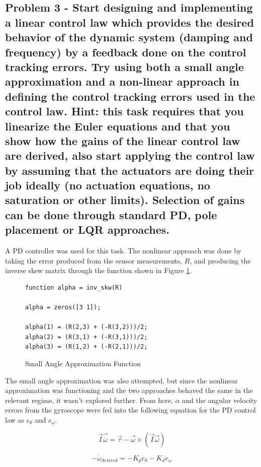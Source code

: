 \subsection{Problem 3 - Start designing and implementing a linear control law which provides the desired behavior of the dynamic system (damping and frequency) by a feedback done on the control tracking errors. Try using both a small angle approximation and a non-linear approach in defining the control tracking errors used in the control law. Hint: this task requires that you linearize the Euler equations and that you show how the gains of the linear control law are derived, also start applying the control law by assuming that the actuators are doing their job ideally (no actuation equations, no saturation or other limits). Selection of gains can be done through standard PD, pole placement or LQR approaches.}

A PD controller was used for this task. The nonlinear approach was done by taking the error produced from the sensor measurements, $R$, and producing the inverse skew matrix through the function shown in Figure \ref{fig:smallThetaCode}.

\begin{figure}[H]
    \centering
    \captionsetup{ justification = centering}
    \begin{lstlisting}
function alpha = inv_skw(R)

alpha = zeros([3 1]);

alpha(1) = (R(2,3) + (-R(3,2)))/2;
alpha(2) = (R(3,1) + (-R(3,1)))/2;
alpha(3) = (R(1,2) + (-R(2,1)))/2;
    \end{lstlisting}
    \caption{Small Angle Approximation Function}
    \label{fig:smallThetaCode}
\end{figure}

The small angle approximation was also attempted, but since the nonlinear approximation was functioning and the two approaches behaved the same in the relevant regime, it wasn't explored further. From here, $\alpha$ and the angular velocity errors from the gyroscope were fed into the following equation for the PD control law as $e_\theta$ and $e_\omega$.

\begin{equation}
    \Vec{I} \Vec{\dot \omega} = \Vec{\tau} - \Vec{\omega} \times (\Vec{I} \Vec{\omega})
\end{equation}

\begin{equation}
    - \dot \omega_{desired} = -K_p e_\theta - K_d e_\omega
\end{equation}

